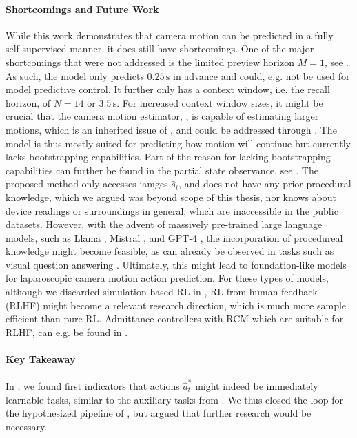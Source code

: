 \paragraph{Shortcomings and Future Work}
While this work demonstrates that camera motion can be predicted in a fully self-supervised manner, it does still have shortcomings. One of the major shortcomings that were not addressed is the limited preview horizon $M=1$, see . As such, the model only predicts $0.25\,\text{s}$ in advance and could, e.g. not be used for model predictive control. It further only has a context window, i.e. the recall horizon, of $N=14$ or $3.5\,\text{s}$. For increased context window sizes, it might be crucial that the camera motion estimator, , is capable of estimating larger motions, which is an inherited issue of , and could be addressed through . The model is thus mostly suited for predicting how motion will continue but currently lacks bootstrapping capabilities. Part of the reason for lacking bootstrapping capabilities can further be found in the partial state observance, see . The proposed method only accesses iamges $\hat{s}_t$, and does not have any prior procedural knowledge, which we argued was beyond scope of this thesis, nor knows about device readings or surroundings in general, which are inaccessible in the public datasets. However, with the advent of massively pre-trained large language models, such as Llama \cite{touvron2023llama}, Mistral \cite{jiang2023mistral}, and GPT-4 \cite{achiam2023gpt}, the incorporation of procedureal knowledge might become feasible, as can already be observed in tasks such as visual question answering \cite{seenivasan2022surgical}. Ultimately, this might lead to foundation-like models for laparoscopic camera motion action prediction. For these types of models, although we discarded simulation-based RL in , RL from human feedback (RLHF) might become a relevant research direction, which is much more sample efficient than pure RL. Admittance controllers with RCM which are suitable for RLHF, can e.g. be found in .

\paragraph{Key Takeaway}
In , we found first indicators that actions $\hat{a}^*_t$ might indeed be immediately learnable tasks, similar to the auxiliary tasks from . We thus closed the loop for the hypothesized pipeline of , but argued that further research would be necessary.

